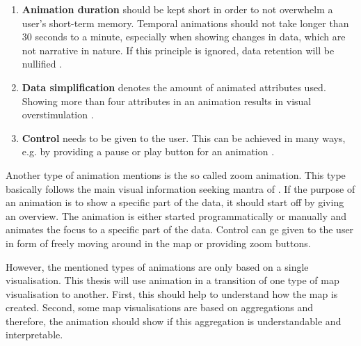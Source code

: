 \begin{enumerate}

\item \textbf{Animation duration} should be kept short in order to not overwhelm a user's short-term memory. Temporal animations should not take longer than 30 seconds to a minute, especially when showing changes in data, which are not narrative in nature. If this principle is ignored, data retention will be nullified .

\item \textbf{Data simplification} denotes the amount of animated attributes used. Showing more than four attributes in an animation results in visual overstimulation .

\item \textbf{Control} needs to be given to the user. This can be achieved in many ways, e.g. by providing a pause or play button for an animation .

\end{enumerate}

Another type of animation \citeauthor{Muehlenhaus2014} mentions is the so called zoom animation. This type basically follows the main visual information seeking mantra of \citeauthor{Shneiderman1996}. If the purpose of an animation is to show a specific part of the data, it should start off by giving an overview. The animation is either started programmatically or manually and animates the focus to a specific part of the data. Control can ge given to the user in form of freely moving around in the map or providing zoom buttons.

However, the mentioned types of animations are only based on a single visualisation. This thesis will use animation in a transition of one type of map visualisation to another. First, this should help to understand how the map is created. Second, some map visualisations are based on aggregations and therefore, the animation should show if this aggregation is understandable and interpretable.